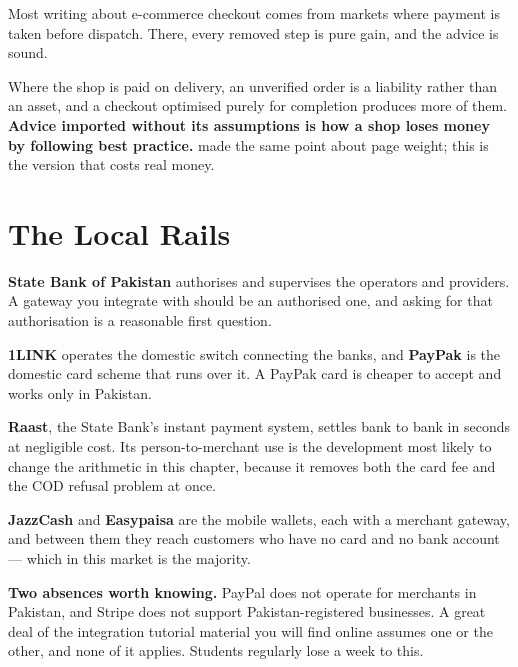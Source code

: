 \begin{conceptbox}
Most writing about e-commerce checkout comes from markets where payment is
taken before dispatch. There, every removed step is pure gain, and the advice
is sound.

\smallskip
Where the shop is paid on delivery, an unverified order is a liability rather
than an asset, and a checkout optimised purely for completion produces more of
them. \textbf{Advice imported without its assumptions is how a shop loses money
by following best practice.}  made the same point about page weight;
this is the version that costs real money.
\end{conceptbox}

\section{The Local Rails}

\begin{examplebox}
\begin{tight}
  \item \textbf{State Bank of Pakistan} authorises and supervises the operators
        and providers. A gateway you integrate with should be an authorised
        one, and asking for that authorisation is a reasonable first question.
  \item \textbf{1LINK} operates the domestic switch connecting the banks, and
        \textbf{PayPak} is the domestic card scheme that runs over it. A PayPak
        card is cheaper to accept and works only in Pakistan.
  \item \textbf{Raast}, the State Bank's instant payment system, settles bank
        to bank in seconds at negligible cost. Its person-to-merchant use is
        the development most likely to change the arithmetic in this chapter,
        because it removes both the card fee and the COD refusal problem at
        once.
  \item \textbf{JazzCash} and \textbf{Easypaisa} are the mobile wallets, each
        with a merchant gateway, and between them they reach customers who have
        no card and no bank account --- which in this market is the majority.
\end{tight}

\smallskip
\textbf{Two absences worth knowing.} PayPal does not operate for merchants in
Pakistan, and Stripe does not support Pakistan-registered businesses. A great
deal of the integration tutorial material you will find online assumes one or
the other, and none of it applies. Students regularly lose a week to this.
\end{examplebox}

